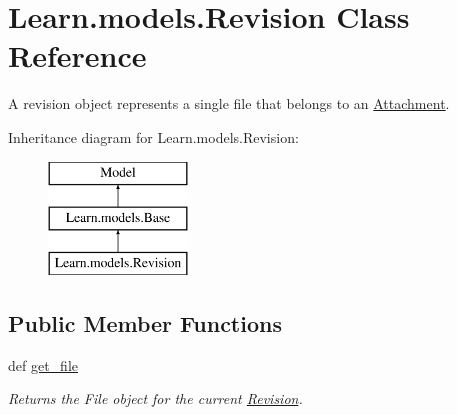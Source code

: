 \hypertarget{class_learn_1_1models_1_1_revision}{\section{Learn.\-models.\-Revision Class Reference}
\label{class_learn_1_1models_1_1_revision}
}


A revision object represents a single file that belongs to an \hyperlink{class_learn_1_1models_1_1_attachment}{Attachment}.  


Inheritance diagram for Learn.\-models.\-Revision\-:\begin{figure}[H]
\begin{center}
\leavevmode
\includegraphics[height=3.000000cm]{class_learn_1_1models_1_1_revision}
\end{center}
\end{figure}
\subsection*{Public Member Functions}
\begin{DoxyCompactItemize}
\item 
def \hyperlink{class_learn_1_1models_1_1_revision_aba5613cb5880b9c860f2713d4528e80e}{get\-\_\-file}
\begin{DoxyCompactList}\small\item\em Returns the File object for the current \hyperlink{class_learn_1_1models_1_1_revision}{Revision}. \end{DoxyCompactList}\end{DoxyCompactItemize}
